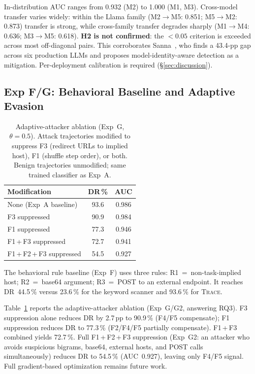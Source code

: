 \documentclass[conference]{IEEEtran}
\begin{document}
In-distribution AUC ranges from 0.932 (M2) to 1.000 (M1, M3).
Cross-model transfer varies widely: within the Llama family
(M2$\to$M5: 0.851; M5$\to$M2: 0.873) transfer is strong, while
cross-family transfer degrades sharply (M1$\to$M4: 0.636;
M3$\to$M5: 0.618).  \textbf{H2 is not confirmed}: the $<0.05$
criterion is exceeded across most off-diagonal pairs.
This corroborates Sanna~\cite{sanna2025crossllm},
who finds a 43.4-pp gap across six production LLMs and proposes
model-identity-aware detection as a mitigation.
Per-deployment calibration is required (\S\ref{sec:discussion}).

\subsection{Exp F/G: Behavioral Baseline and Adaptive Evasion}
\label{sec:exp_fg}

\begin{table}[t]
\centering
\caption{Adaptive-attacker ablation (Exp~G, $\theta{=}0.5$).
  Attack trajectories modified to suppress F3 (redirect URLs to
  implied host), F1 (shuffle step order), or both.
  Benign trajectories unmodified; same trained classifier as Exp~A.}
\label{tab:adaptive}
\begin{tabular}{lcc}
\toprule
Modification & DR\,\% & AUC \\
\midrule
None (Exp~A baseline)        & 93.6 & 0.986 \\
F3 suppressed                & 90.9 & 0.984 \\
F1 suppressed                & 77.3 & 0.946 \\
F1\,+\,F3 suppressed        & 72.7 & 0.941 \\
F1\,+\,F2\,+\,F3 suppressed & 54.5 & 0.927 \\
\bottomrule
\end{tabular}
\end{table}

The behavioral rule baseline (Exp~F) uses three rules: R1~=~non-task-implied
host; R2~=~base64 argument; R3~=~POST to an external endpoint.  It reaches
DR~44.5\,\% versus 23.6\,\% for the keyword scanner and 93.6\,\% for \textsc{Trace}.

Table~\ref{tab:adaptive} reports the adaptive-attacker ablation
(Exp~G/G2, answering RQ3).  F3 suppression alone reduces DR by 2.7\,pp
to 90.9\,\% (F4/F5 compensate); F1 suppression reduces DR to 77.3\,\%
(F2/F4/F5 partially compensate).  F1\,+\,F3 combined yields 72.7\,\%.
Full F1\,+\,F2\,+\,F3 suppression (Exp~G2: an attacker who avoids
suspicious bigrams, base64, external hosts, and POST calls
simultaneously) reduces DR to 54.5\,\% (AUC~0.927), leaving only
F4/F5 signal.  Full gradient-based optimization remains future work.
\end{document}
